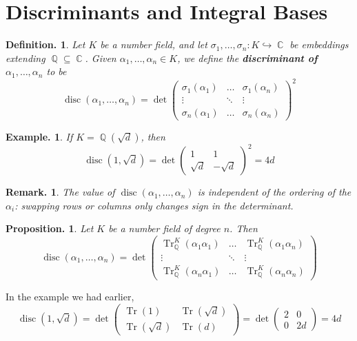 \documentclass[11pt, a4paper]{memoir}
\DeclareMathOperator{\Q}{{\mathbb{Q}}}
\DeclareMathOperator{\C}{{\mathbb{C}}}
\newcommand{\hto}[0]{\ensuremath{\hookrightarrow}}
\theoremstyle{change}
\newtheorem{proposition}[theorem]{Proposition.}
\theoremstyle{plain}
\theoremstyle{nonumberplain}
\newtheorem{definition}{Definition.}
\newtheorem{example}{Example.}
\newtheorem{remark}{Remark.}
\DeclareMathOperator{\disc}{disc}
\DeclareMathOperator{\Tr}{Tr}
\begin{document}
\section{Discriminants and Integral Bases}
\begin{definition}
    Let $K$ be a number field, and let $\sigma_1,\ldots,\sigma_n:K\hto\C$ be embeddings extending $\Q\subseteq\C$.
    Given $\alpha_1,\ldots,\alpha_n\in K$, we define the \textbf{discriminant of $\alpha_1,\ldots,\alpha_n$} to be
    \begin{equation*}
        \disc(\alpha_1,\ldots,\alpha_n)=\det
        \begin{pmatrix}
            \sigma_1(\alpha_1) & \hdots & \sigma_1(\alpha_n)\\
            \vdots &\ddots&\vdots\\
            \sigma_n(\alpha_1) & \hdots & \sigma_n(\alpha_n)
        \end{pmatrix}^2
    \end{equation*}
\end{definition}
\begin{example}
    If $K=\Q(\sqrt{d})$, then
    \begin{equation*}\disc(1,\sqrt{d})=\det\begin{pmatrix}1&1\\\sqrt{d}&-\sqrt{d}\end{pmatrix}^2=4d\end{equation*}
\end{example}
\begin{remark}
    The value of $\disc(\alpha_1,\ldots,\alpha_n)$ is independent of the ordering of the $\alpha_i$: swapping rows or columns only changes sign in the determinant.
\end{remark}
\begin{proposition}
    Let $K$ be a number field of degree $n$.
    Then
    \begin{equation*}
        \disc(\alpha_1,\ldots,\alpha_n)=\det
        \begin{pmatrix}
            \Tr_{\Q}^K(\alpha_1\alpha_1)&\hdots&\Tr_{\Q}^K(\alpha_1\alpha_n)\\
            \vdots&\ddots&\vdots\\
            \Tr_{\Q}^K(\alpha_n\alpha_1)&\hdots&\Tr_{\Q}^K(\alpha_n\alpha_n)
        \end{pmatrix}
    \end{equation*}
\end{proposition}
In the example we had earlier,
\begin{equation*}
    \disc(1,\sqrt{d})=\det\begin{pmatrix}\Tr(1)&\Tr(\sqrt{d})\\\Tr(\sqrt{d})&\Tr(d)\end{pmatrix}=\det\begin{pmatrix}2&0\\0&2d\end{pmatrix}=4d
\end{equation*}
\end{document}
